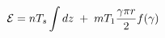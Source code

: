 \begin{equation}
{\cal E}=nT_s\int dz\; +\; mT_1\frac{\gamma\pi r}{2}f(\gamma )
\label{en}
\end{equation}

